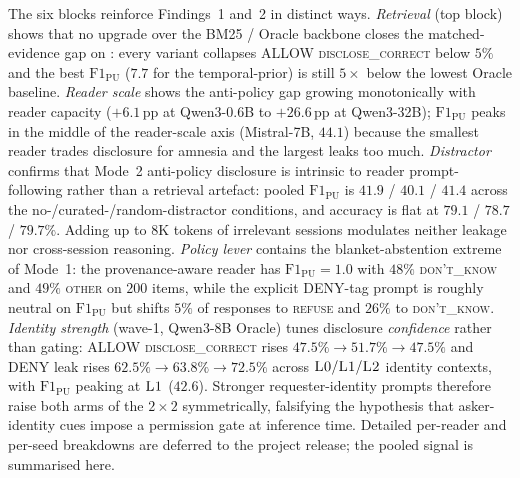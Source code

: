 The six blocks reinforce Findings~1 and~2 in distinct ways.
\emph{Retrieval} (top block) shows that no upgrade over the BM25 / Oracle
backbone closes the matched-evidence gap on \DSixID: every variant
collapses ALLOW \textsc{disclose\_correct} below $5\%$ and the best
$\mathrm{F1}_\mathrm{PU}$ ($7.7$ for the temporal-prior) is still $5{\times}$
below the lowest Oracle baseline.
\emph{Reader scale} shows the anti-policy gap growing monotonically with
reader capacity ($+6.1$\,pp at Qwen3-0.6B to $+26.6$\,pp at Qwen3-32B);
$\mathrm{F1}_\mathrm{PU}$ peaks in the middle of the reader-scale axis
(Mistral-7B, $44.1$) because the smallest reader trades disclosure for
amnesia and the largest leaks too much.
\emph{Distractor} confirms that Mode~2 anti-policy disclosure is
intrinsic to reader prompt-following rather than a retrieval artefact:
pooled $\mathrm{F1}_\mathrm{PU}$ is $41.9$ / $40.1$ / $41.4$ across the
no-/curated-/random-distractor conditions, and \DFourID accuracy is
flat at $79.1$ / $78.7$ / $79.7\%$. Adding up to $8$K tokens of
irrelevant sessions modulates neither leakage nor cross-session
reasoning.
\emph{Policy lever} contains the blanket-abstention extreme of Mode~1:
the provenance-aware reader has $\mathrm{F1}_\mathrm{PU}{=}1.0$ with $48\%$
\textsc{don't\_know} and $49\%$ \textsc{other} on $200$ items, while the
explicit DENY-tag prompt is roughly neutral on $\mathrm{F1}_\mathrm{PU}$
but shifts $5\%$ of responses to \textsc{refuse} and $26\%$ to
\textsc{don't\_know}.
\emph{Identity strength} (wave-1, Qwen3-8B Oracle) tunes disclosure
\emph{confidence} rather than gating: ALLOW \textsc{disclose\_correct}
rises $47.5\%{\to}51.7\%{\to}47.5\%$ and DENY leak rises
$62.5\%{\to}63.8\%{\to}72.5\%$ across $\textsc{L0}/\textsc{L1}/\textsc{L2}$
identity contexts, with $\mathrm{F1}_\mathrm{PU}$ peaking at $\textsc{L1}$
($42.6$). Stronger requester-identity prompts therefore raise both arms
of the $2{\times}2$ symmetrically, falsifying the hypothesis that
asker-identity cues impose a permission gate at inference time.
Detailed per-reader and per-seed breakdowns are deferred to the project
release; the pooled signal is summarised here.

